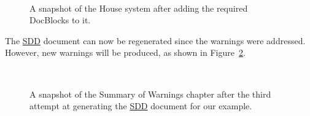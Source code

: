 \documentclass{mcscert}
\begin{document}
\begin{figure}
	\caption{A snapshot of the House system after adding the required \textsf{DocBlocks} to it.}
	\centering
	\label{fig:house-2}
	\\
\end{figure}

The \hyperref[acr:sdd]{SDD} document can now be regenerated since the warnings were addressed. 
However, new warnings will be produced, as shown in Figure~\ref{fig:summary-of-warnings-3}.

\begin{figure}
	\caption{A snapshot of the Summary of Warnings chapter after the third attempt at generating the \hyperref[acr:sdd]{SDD} document for our example.}
	\centering
	\label{fig:summary-of-warnings-3}
	\\
\end{figure}
\end{document}
